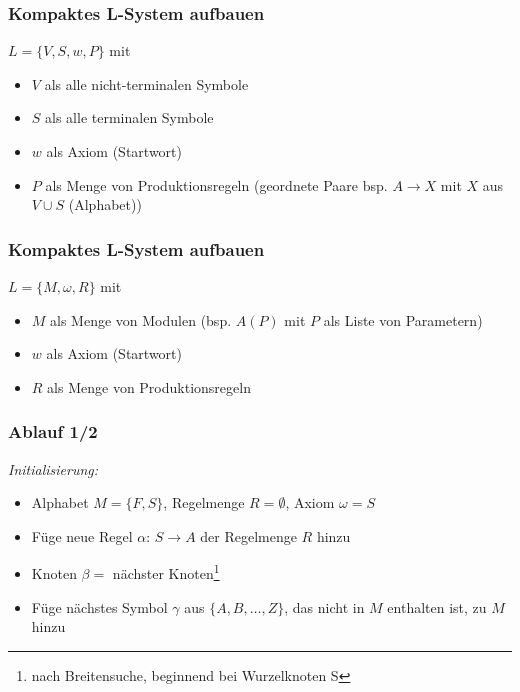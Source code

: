 \documentclass[12pt]{beamer}
\begin{document}
    \begin{frame}
        \frametitle{Kompaktes L-System aufbauen}
        $L = \{V, S, w, P\}$ mit
        \begin{itemize}
            \item $V$ als alle nicht-terminalen Symbole
            \item $S$ als alle terminalen Symbole
            \item $w$ als Axiom (Startwort)
            \item $P$ als Menge von Produktionsregeln (geordnete Paare bsp. $A \rightarrow X$ mit $X$ aus $V \cup S$
            (Alphabet))
        \end{itemize}
    \end{frame}

    \begin{frame}
        \frametitle{Kompaktes L-System aufbauen}
        $L = \{M, \omega, R\}$ mit
        \begin{itemize}
            \item $M$ als Menge von Modulen (bsp. $A(P)$ mit $P$ als Liste von Parametern)
            \item $w$ als Axiom (Startwort)
            \item $R$ als Menge von Produktionsregeln
        \end{itemize}
    \end{frame}

    \begin{frame}
        \frametitle{Ablauf 1/2}
        \textit{Initialisierung:}
        \begin{itemize}
            \item[1.] Alphabet $M=\{F,S\}$, Regelmenge $R=\emptyset$, Axiom $\omega=S$
            \item[2.] Füge neue Regel $\alpha$: $S \rightarrow A$ der Regelmenge $R$ hinzu
            \item[3.] Knoten $\beta=$ nächster Knoten\footnote{nach Breitensuche, beginnend bei Wurzelknoten S}
            \item[4.] Füge nächstes Symbol $\gamma$ aus $\{A,B,\dots,Z\}$, das nicht in $M$ enthalten ist, zu $M$ hinzu
        \end{itemize}
    \end{frame}
\end{document}
